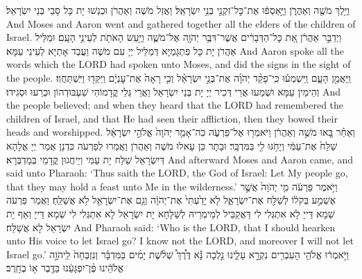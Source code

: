 {%
{וַיֵּ֥לֶךְ מֹשֶׁ֖ה וְאַהֲרֹ֑ן וַיַּ֣אַסְפ֔וּ אֶת־כׇּל־זִקְנֵ֖י בְּנֵ֥י יִשְׂרָאֵֽל׃}
{וַאֲזַל מֹשֶׁה וְאַהֲרֹן וּכְנַשׁוּ יָת כָּל סָבֵי בְּנֵי יִשְׂרָאֵל׃}
{And Moses and Aaron went and gathered together all the elders of the children of Israel.}{}
{וַיְדַבֵּ֣ר אַהֲרֹ֔ן אֵ֚ת כׇּל־הַדְּבָרִ֔ים אֲשֶׁר־דִּבֶּ֥ר יְהֹוָ֖ה אֶל־מֹשֶׁ֑ה וַיַּ֥עַשׂ הָאֹתֹ֖ת לְעֵינֵ֥י הָעָֽם׃}
{וּמַלֵּיל אַהֲרֹן יָת כָּל פִּתְגָמַיָּא דְּמַלֵּיל יְיָ עִם מֹשֶׁה וַעֲבַד אָתַיָּא לְעֵינֵי עַמָּא׃}
{And Aaron spoke all the words which the LORD had spoken unto Moses, and did the signs in the sight of the people.}{}
{וַֽיַּאֲמֵ֖ן הָעָ֑ם וַֽיִּשְׁמְע֡וּ כִּֽי־פָקַ֨ד יְהֹוָ֜ה אֶת־בְּנֵ֣י יִשְׂרָאֵ֗ל וְכִ֤י רָאָה֙ אֶת־עׇנְיָ֔ם וַֽיִּקְּד֖וּ וַיִּֽשְׁתַּחֲוֽוּ׃}
{וְהֵימֵין עַמָּא וּשְׁמַעוּ אֲרֵי דְּכִיר יְיָ יָת בְּנֵי יִשְׂרָאֵל וַאֲרֵי גְּלֵי קֳדָמוֹהִי שִׁעְבּוּדְהוֹן וּכְרַעוּ וּסְגִידוּ׃}
{And the people believed; and when they heard that the LORD had remembered the children of Israel, and that He had seen their affliction, then they bowed their heads and worshipped.}{}
\newperek
{}%
{וְאַחַ֗ר בָּ֚אוּ מֹשֶׁ֣ה וְאַהֲרֹ֔ן וַיֹּאמְר֖וּ אֶל־פַּרְעֹ֑ה כֹּֽה־אָמַ֤ר יְהֹוָה֙ אֱלֹהֵ֣י יִשְׂרָאֵ֔ל שַׁלַּח֙ אֶת־עַמִּ֔י וְיָחֹ֥גּוּ לִ֖י בַּמִּדְבָּֽר׃
}
{וּבָתָר כֵּן עָאלוּ מֹשֶׁה וְאַהֲרֹן וַאֲמַרוּ לְפַרְעֹה כִּדְנָן אֲמַר יְיָ אֱלָהָא דְּיִשְׂרָאֵל שַׁלַּח יָת עַמִּי וְיֵיחֲגוּן קֳדָמַי בְּמַדְבְּרָא׃}
{And afterward Moses and Aaron came, and said unto Pharaoh: ‘Thus saith the LORD, the God of Israel: Let My people go, that they may hold a feast unto Me in the wilderness.’}{}
{וַיֹּ֣אמֶר פַּרְעֹ֔ה מִ֤י יְהֹוָה֙ אֲשֶׁ֣ר אֶשְׁמַ֣ע בְּקֹל֔וֹ לְשַׁלַּ֖ח אֶת־יִשְׂרָאֵ֑ל לֹ֤א יָדַ֙עְתִּי֙ אֶת־יְהֹוָ֔ה וְגַ֥ם אֶת־יִשְׂרָאֵ֖ל לֹ֥א אֲשַׁלֵּֽחַ׃}
{וַאֲמַר פַּרְעֹה שְׁמָא דַּייָ לָא אִתְגְּלִי לִי דַּאֲקַבֵּיל לְמֵימְרֵיהּ לְשַׁלָּחָא יָת יִשְׂרָאֵל לָא אִתְגְּלִי לִי שְׁמָא דַּייָ וְאַף יָת יִשְׂרָאֵל לָא אֲשַׁלַּח׃}
{And Pharaoh said: ‘Who is the LORD, that I should hearken unto His voice to let Israel go? I know not the LORD, and moreover I will not let Israel go.’}{}
{וַיֹּ֣אמְר֔וּ אֱלֹהֵ֥י הָעִבְרִ֖ים נִקְרָ֣א עָלֵ֑ינוּ נֵ֣לְכָה נָּ֡א דֶּ֩רֶךְ֩ שְׁלֹ֨שֶׁת יָמִ֜ים בַּמִּדְבָּ֗ר וְנִזְבְּחָה֙ לַֽיהֹוָ֣ה אֱלֹהֵ֔ינוּ פֶּ֨ן־יִפְגָּעֵ֔נוּ בַּדֶּ֖בֶר א֥וֹ בֶחָֽרֶב׃
}}
